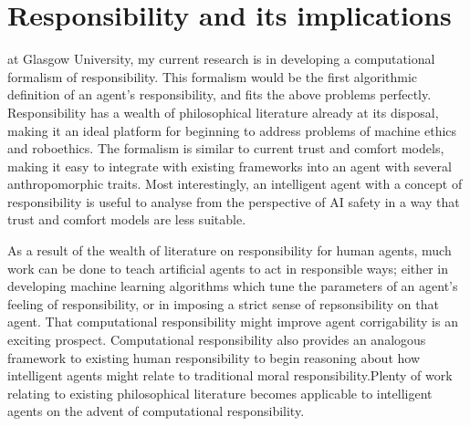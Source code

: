 \newpage

\section{Responsibility and its implications}
 at Glasgow University, my current research is in developing a computational formalism of responsibility. This formalism would be the first algorithmic definition of an agent's responsibility, and fits the above problems perfectly. Responsibility has a wealth of philosophical literature already at its disposal, making it an ideal platform for beginning to address problems of machine ethics and roboethics. The formalism is similar to current trust and comfort models, making it easy to integrate with existing frameworks into an agent with several anthropomorphic traits. Most interestingly, an intelligent agent with a concept of responsibility is useful to analyse from the perspective of AI safety in a way that trust and comfort models are less suitable.\par

As a result of the wealth of literature on responsibility for human agents, much work can be done to teach artificial agents to act in responsible ways; either in developing machine learning algorithms which tune the parameters of an agent's feeling of responsibility, or in imposing a strict sense of repsonsibility on that agent.  That computational responsibility might improve agent corrigability\cite{corrigability} is an exciting prospect. Computational responsibility also provides an analogous framework to existing human responsibility to begin reasoning about how intelligent agents might relate to traditional moral responsibility.Plenty of work relating to existing philosophical literature becomes applicable to intelligent agents on the advent of computational responsibility.\par

